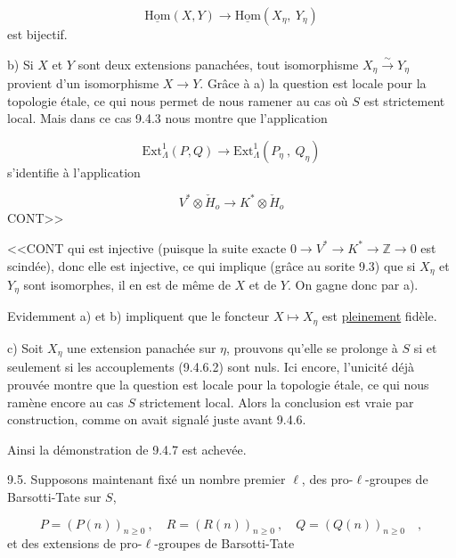 \begin{equation*}
\underline{\mathrm{Hom}}(X,Y) \longrightarrow \underline{\mathrm{Hom}}(X_\eta,\ Y_\eta)
\end{equation*}
est bijectif.

b)  Si $X$ et $Y$ sont deux extensions panachées, tout isomorphisme $X_\eta \xrightarrow{\sim} Y_\eta$ provient d'un isomorphisme $X \longrightarrow Y$. Grâce à a) la question est locale pour la topologie étale, ce qui nous permet de nous ramener au cas où $S$ est strictement local. Mais dans ce cas 9.4.3 nous montre que l'application

\begin{equation*}
\mathrm{Ext}^1_\Lambda(P,Q) \longrightarrow \mathrm{Ext}^1_\Lambda(P_\eta\ ,\ Q_\eta)
\end{equation*}
s'identifie à l'application

\begin{equation*}
V^* \otimes \check{H}_o \longrightarrow K^* \otimes \check{H}_o
\end{equation*}
CONT>>



<<CONT qui est injective (puisque la suite exacte $0 \longrightarrow V^* \longrightarrow K^* \longrightarrow \mathbb{Z} \longrightarrow 0$ est scindée), donc elle est injective, ce qui implique (grâce au sorite 9.3) que si $X_\eta$ et $Y_\eta$ sont isomorphes, il en est de même de $X$ et de $Y$. On gagne donc par a).

Evidemment a) et b) impliquent que le foncteur $X \longmapsto X_\eta$ est \underline{pleinement} fidèle.

c)  Soit $X_\eta$ une extension panachée sur $\eta$, prouvons qu'elle se prolonge à $S$ si et seulement si les accouplements (9.4.6.2) sont nuls. Ici encore, l'unicité déjà prouvée montre que la question est locale pour la topologie étale, ce qui nous ramène encore au cas $S$ strictement local. Alors la conclusion est vraie par construction, comme on avait signalé juste avant 9.4.6.

Ainsi la démonstration de 9.4.7 est achevée.

9.5.  Supposons maintenant fixé un nombre premier $\ell$, des pro-$\ell$-groupes de Barsotti-Tate sur $S$,

\begin{equation}\tag{9.5.1}
P = (P(n))_{n \geq 0} \ , \quad R = (R(n))_{n \geq 0} \ , \quad Q = (Q(n))_{n \geq 0} \quad ,
\end{equation}
et des extensions de pro-$\ell$-groupes de Barsotti-Tate

